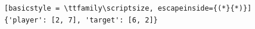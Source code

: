 \begin{lstlisting}[basicstyle = \ttfamily\scriptsize, escapeinside={(*}{*)}]
{'player': [2, 7], 'target': [6, 2]}
\end{lstlisting}